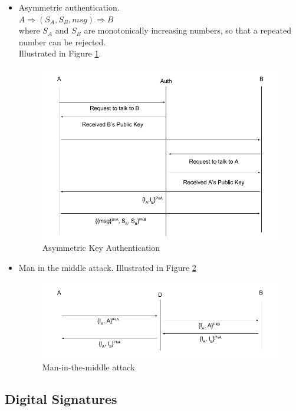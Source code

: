 \documentclass[parskip=half]{scrartcl}
\begin{document}
        \begin{itemize}
            \item
            Asymmetric authentication. \\
            $A \Rightarrow (S_A, S_B, msg) \Rightarrow B $\\
            where $S_A$ and $S_B$ are monotonically increasing numbers, so that a repeated number can be rejected.\\
            Illustrated in Figure \ref{fig:asymmetric_auth}.
            \begin{figure}[ht]
                \centering
                \includegraphics[width=.6\textwidth]{asymmetric_auth}
                \caption{Asymmetric Key Authentication}
                \label{fig:asymmetric_auth}
            \end{figure}
            \item
            Man in the middle attack. Illustrated in Figure \ref{fig:man_in_the_middle_attack}
            \begin{figure}[ht]
                \centering
                \includegraphics[width=.6\textwidth]{man_in_the_middle_attack}
                \caption{Man-in-the-middle attack}
                \label{fig:man_in_the_middle_attack}
            \end{figure}
        \end{itemize}
    

    \subsection{Digital Signatures} %
    \label{sub:digital_signatures}
\end{document}
